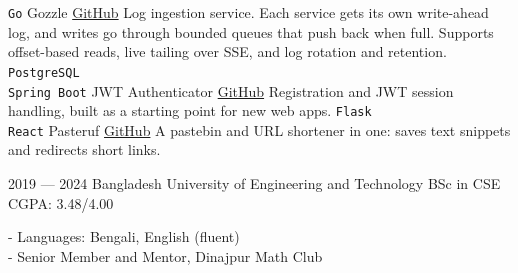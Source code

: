 \documentclass[9pt]{developercv}
\begin{document}
\begin{entrylist}
    \entry
        {\texttt{Go}}
		{Gozzle}
		{{\href{https://github.com/mortytheplatypus/gozzle}{GitHub}}}
		{Log ingestion service. Each service gets its own write-ahead log, and writes go through bounded queues that push back when full. Supports offset-based reads, live tailing over SSE, and log rotation and retention.}
    \entry
		{\texttt{PostgreSQL} \\ \texttt{Spring Boot}}
		{JWT Authenticator}
		{{\href{https://github.com/mortytheplatypus/JWT-authenticator}{GitHub}}}
		{Registration and JWT session handling, built as a starting point for new web apps.}
    \entry
		{\texttt{Flask} \\ \texttt{React}}
		{Pasteruf}
		{{\href{https://github.com/mortytheplatypus/pasteruf-backend}{GitHub}}}
		{A pastebin and URL shortener in one: saves text snippets and redirects short links.}
\end{entrylist}

\newpage

\begin{entrylist}
    \entry
		{2019 --- 2024}
		{Bangladesh University of Engineering and Technology}
		{BSc in CSE}
		{CGPA: 3.48/4.00}
\end{entrylist}

    \qquad  - Languages: Bengali, English (fluent) \\
    \qquad  - Senior Member and Mentor, Dinajpur Math Club 
\end{document}

